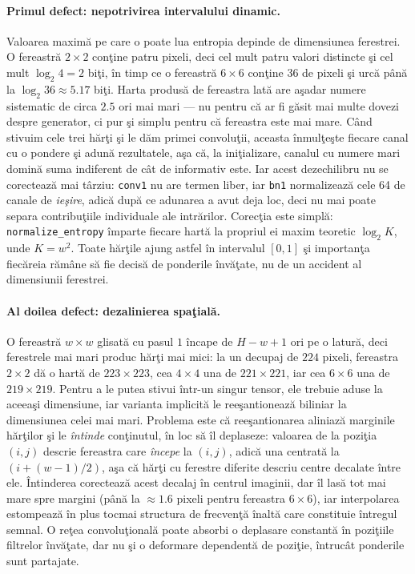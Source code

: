 \paragraph{Primul defect: nepotrivirea intervalului dinamic.} Valoarea maximă pe
care o poate lua entropia depinde de dimensiunea ferestrei. O fereastră
$2\times2$ conţine patru pixeli, deci cel mult patru valori distincte şi cel
mult $\log_2 4 = 2$ biţi, în timp ce o fereastră $6\times6$ conţine 36 de pixeli
şi urcă până la $\log_2 36 \approx 5.17$ biţi. Harta produsă de fereastra lată
are aşadar numere sistematic de circa $2.5$ ori mai mari --- nu pentru că ar fi
găsit mai multe dovezi despre generator, ci pur şi simplu pentru că fereastra
este mai mare. Când stivuim cele trei hărţi şi le dăm primei convoluţii, aceasta
înmulţeşte fiecare canal cu o pondere şi adună rezultatele, aşa că, la
iniţializare, canalul cu numere mari domină suma indiferent de cât de informativ
este. Iar acest dezechilibru nu se corectează mai târziu: \texttt{conv1} nu are
termen liber, iar \texttt{bn1} normalizează cele 64 de canale de \emph{ieşire},
adică după ce adunarea a avut deja loc, deci nu mai poate separa contribuţiile
individuale ale intrărilor. Corecţia este simplă: \texttt{normalize\_entropy}
împarte fiecare hartă la propriul ei maxim teoretic $\log_2 K$, unde $K = w^2$.
Toate hărţile ajung astfel în intervalul $[0,1]$ şi importanţa fiecăreia rămâne
să fie decisă de ponderile învăţate, nu de un accident al dimensiunii ferestrei.

\paragraph{Al doilea defect: dezalinierea spaţială.} O fereastră $w\times w$
glisată cu pasul $1$ încape de $H-w+1$ ori pe o latură, deci ferestrele mai mari
produc hărţi mai mici: la un decupaj de $224$ pixeli, fereastra $2\times2$ dă o
hartă de $223\times223$, cea $4\times4$ una de $221\times221$, iar cea $6\times6$
una de $219\times219$. Pentru a le putea stivui într-un singur tensor, ele
trebuie aduse la aceeaşi dimensiune, iar varianta implicită le reeşantionează
biliniar la dimensiunea celei mai mari. Problema este că reeşantionarea aliniază
marginile hărţilor şi le \emph{întinde} conţinutul, în loc să îl deplaseze:
valoarea de la poziţia $(i,j)$ descrie fereastra care \emph{începe} la $(i,j)$,
adică una centrată la $(i + (w-1)/2)$, aşa că hărţi cu ferestre diferite descriu
centre decalate între ele. Întinderea corectează acest decalaj în centrul
imaginii, dar îl lasă tot mai mare spre margini (până la $\approx1.6$ pixeli
pentru fereastra $6\times6$), iar interpolarea estompează în plus tocmai
structura de frecvenţă înaltă care constituie întregul semnal. O reţea
convoluţională poate absorbi o deplasare constantă în poziţiile filtrelor
învăţate, dar nu şi o deformare dependentă de poziţie, întrucât ponderile sunt
partajate.

